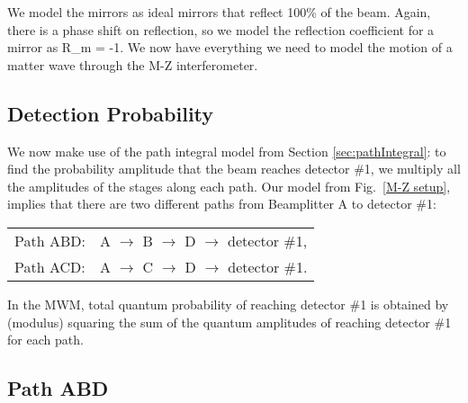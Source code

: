 We model the mirrors as ideal mirrors that reflect 100\% of the beam. Again, there is a phase shift on reflection, so we model the reflection coefficient for a mirror as
%
\beq
{\cal R}_{\rm m} = -1.
\eeq
%
We now have everything we need to model the motion of a matter wave through the M-Z interferometer.

\subsection{Detection Probability}
\label{MZ detection probability section}
We now make use of the path integral model from Section \ref{sec:pathIntegral}: to find the probability amplitude that the beam reaches detector \#1, we multiply all the amplitudes of the stages along each path. Our model from Fig.~\ref{M-Z setup}, implies that there are two different paths from Beamplitter A to detector \#1:  
%
\begin{center}
\begin{tabular}{ll}
Path ABD: & A $\rightarrow$ B $\rightarrow$ D $\rightarrow$ detector \#1, \\
Path ACD: & A $\rightarrow$ C $\rightarrow$ D $\rightarrow$ detector \#1. 
\end{tabular}
\end{center}
%
In the MWM, total quantum probability of reaching detector \#1 is obtained by (modulus) squaring the sum of the quantum amplitudes of reaching detector \#1 for  each path.  

\subsection{Path ABD}

